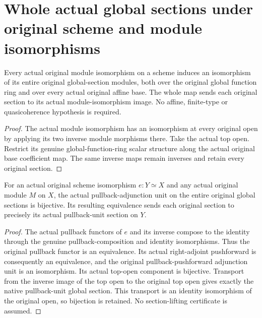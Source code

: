 \section{Whole actual global sections under original scheme and module isomorphisms}

\begin{theorem}\label{thm:actual-module-iso-global-sections}
\leanok
Every actual original module isomorphism on a scheme induces an
isomorphism of its entire original global-section modules, both over
the original global function ring and over every actual original
affine base. The whole map sends each original section to its actual
module-isomorphism image. No affine, finite-type or quasicoherence
hypothesis is required.
\end{theorem}
\begin{proof}
The actual module isomorphism has an isomorphism at every original
open by applying its two inverse module morphisms there. Take the
actual top open. Restrict its genuine global-function-ring scalar
structure along the actual original base coefficient map. The same
inverse maps remain inverses and retain every original section.
\end{proof}

\begin{theorem}\label{thm:actual-scheme-iso-pullback-global-sections}
\leanok
For an actual original scheme isomorphism $e:Y\simeq X$ and any
actual original module $M$ on $X$, the actual pullback-adjunction
unit on the entire original global sections is bijective. Its
resulting equivalence sends each original section to precisely its
actual pullback-unit section on $Y$.
\end{theorem}
\begin{proof}
The actual pullback functors of $e$ and its inverse compose to the
identity through the genuine pullback-composition and identity
isomorphisms. Thus the original pullback functor is an equivalence.
Its actual right-adjoint pushforward is consequently an equivalence,
and the original pullback-pushforward adjunction unit is an
isomorphism. Its actual top-open component is bijective. Transport
from the inverse image of the top open to the original top open
gives exactly the native pullback-unit global section. This
transport is an identity isomorphism of the original open, so
bijection is retained. No section-lifting certificate is assumed.
\end{proof}

